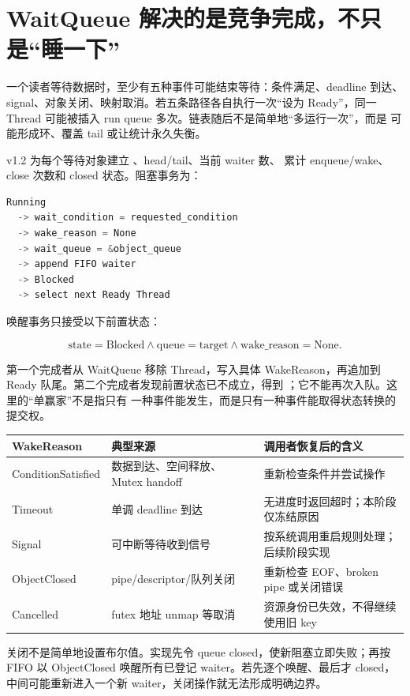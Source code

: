 \section{WaitQueue 解决的是竞争完成，不只是“睡一下”}

一个读者等待数据时，至少有五种事件可能结束等待：条件满足、deadline 到达、
signal、对象关闭、映射取消。若五条路径各自执行一次“设为 Ready”，同一
Thread 可能被插入 run queue 多次。链表随后不是简单地“多运行一次”，而是
可能形成环、覆盖 tail 或让统计永久失衡。

v1.2 为每个等待对象建立 、head/tail、当前 waiter 数、
累计 enqueue/wake、close 次数和 closed 状态。阻塞事务为：

\begin{lstlisting}[language=C++,caption={等待提交的语义顺序}]
Running
  -> wait_condition = requested_condition
  -> wake_reason = None
  -> wait_queue = &object_queue
  -> append FIFO waiter
  -> Blocked
  -> select next Ready Thread
\end{lstlisting}

唤醒事务只接受以下前置状态：

\[
  \mathrm{state=Blocked}\land
  \mathrm{queue=target}\land
  \mathrm{wake\_reason=None}.
\]

第一个完成者从 WaitQueue 移除 Thread，写入具体 WakeReason，再追加到 Ready
队尾。第二个完成者发现前置状态已不成立，得到
；它不能再次入队。这里的“单赢家”不是指只有
一种事件能发生，而是只有一种事件能取得状态转换的提交权。

\begin{longtable}{L{0.27\textwidth}L{0.25\textwidth}L{0.36\textwidth}}
\toprule
WakeReason & 典型来源 & 调用者恢复后的含义\\
\midrule
ConditionSatisfied & 数据到达、空间释放、Mutex handoff & 重新检查条件并尝试操作\\
Timeout & 单调 deadline 到达 & 无进度时返回超时；本阶段仅冻结原因\\
Signal & 可中断等待收到信号 & 按系统调用重启规则处理；后续阶段实现\\
ObjectClosed & pipe/descriptor/队列关闭 & 重新检查 EOF、broken pipe 或关闭错误\\
Cancelled & futex 地址 unmap 等取消 & 资源身份已失效，不得继续使用旧 key\\
\bottomrule
\end{longtable}

关闭不是简单地设置布尔值。实现先令 queue closed，使新阻塞立即失败；再按
FIFO 以 ObjectClosed 唤醒所有已登记 waiter。若先逐个唤醒、最后才 closed，
中间可能重新进入一个新 waiter，关闭操作就无法形成明确边界。

